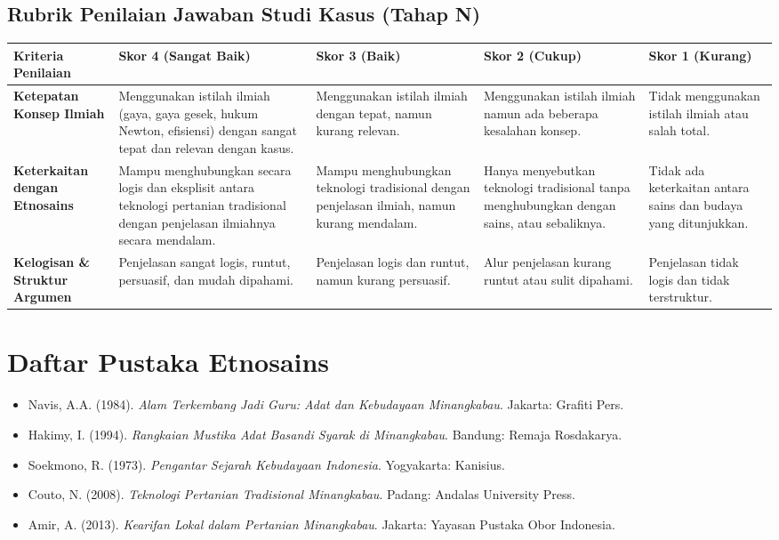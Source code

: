 \documentclass[12pt,a4paper]{article}
\begin{document}
\subsection{Rubrik Penilaian Jawaban Studi Kasus (Tahap N)}

\begin{center}
\begin{tabular}{|p{3cm}|p{3cm}|p{3cm}|p{3cm}|p{3cm}|}
\hline
\textbf{Kriteria Penilaian} & \textbf{Skor 4 (Sangat Baik)} & \textbf{Skor 3 (Baik)} & \textbf{Skor 2 (Cukup)} & \textbf{Skor 1 (Kurang)} \\
\hline
\textbf{Ketepatan Konsep Ilmiah} & Menggunakan istilah ilmiah (gaya, gaya gesek, hukum Newton, efisiensi) dengan sangat tepat dan relevan dengan kasus. & Menggunakan istilah ilmiah dengan tepat, namun kurang relevan. & Menggunakan istilah ilmiah namun ada beberapa kesalahan konsep. & Tidak menggunakan istilah ilmiah atau salah total. \\
\hline
\textbf{Keterkaitan dengan Etnosains} & Mampu menghubungkan secara logis dan eksplisit antara teknologi pertanian tradisional dengan penjelasan ilmiahnya secara mendalam. & Mampu menghubungkan teknologi tradisional dengan penjelasan ilmiah, namun kurang mendalam. & Hanya menyebutkan teknologi tradisional tanpa menghubungkan dengan sains, atau sebaliknya. & Tidak ada keterkaitan antara sains dan budaya yang ditunjukkan. \\
\hline
\textbf{Kelogisan \& Struktur Argumen} & Penjelasan sangat logis, runtut, persuasif, dan mudah dipahami. & Penjelasan logis dan runtut, namun kurang persuasif. & Alur penjelasan kurang runtut atau sulit dipahami. & Penjelasan tidak logis dan tidak terstruktur. \\
\hline
\end{tabular}
\end{center}

\vspace{1cm}

\section{Daftar Pustaka Etnosains}
\begin{itemize}
\item Navis, A.A. (1984). \textit{Alam Terkembang Jadi Guru: Adat dan Kebudayaan Minangkabau}. Jakarta: Grafiti Pers.
\item Hakimy, I. (1994). \textit{Rangkaian Mustika Adat Basandi Syarak di Minangkabau}. Bandung: Remaja Rosdakarya.
\item Soekmono, R. (1973). \textit{Pengantar Sejarah Kebudayaan Indonesia}. Yogyakarta: Kanisius.
\item Couto, N. (2008). \textit{Teknologi Pertanian Tradisional Minangkabau}. Padang: Andalas University Press.
\item Amir, A. (2013). \textit{Kearifan Lokal dalam Pertanian Minangkabau}. Jakarta: Yayasan Pustaka Obor Indonesia.
\end{itemize}
\end{document}
